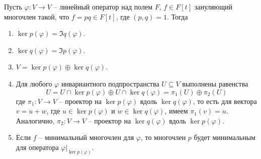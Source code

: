 \begin{claim}
\label{claim::IdealRootDec}
Пусть $\varphi\colon V\to V$ -- линейный оператор над полем $F$, $f\in F[t]$ зануляющий многочлен такой, что $f = p q \in F[t]$, где $(p, q) = 1$.
Тогда
\begin{enumerate}
\item $\ker p(\varphi) = \Im q(\varphi)$.

\item $\ker q(\varphi) = \Im p(\varphi)$.

\item $V = \ker p(\varphi) \oplus \ker q(\varphi)$.

\item Для любого $\varphi$ инвариантного подпространства $U\subseteq V$ выполнены равенства
\[
U = U\cap \ker p(\varphi) \oplus U \cap \ker q(\varphi) = \pi_1(U)\oplus \pi_2(U)
\]
где $\pi_1 \colon V\to V$ -- проектор на $\ker p(\varphi)$ вдоль $\ker q(\varphi)$, то есть для вектора $v = u + w$, где $u\in \ker p(\varphi)$ и $w\in \ker q(\varphi)$, имеем $\pi_1(v) = u$.
Аналогично, $\pi_2\colon V\to V$ -- проектор на $\ker q(\varphi)$ вдоль $\ker p(\varphi)$.

\item Если $f$ -- минимальный многочлен для $\varphi$, то  многочлен $p$ будет минимальным для оператора $\varphi|_{\ker p(\varphi)}$.

\end{enumerate}
\end{claim}
